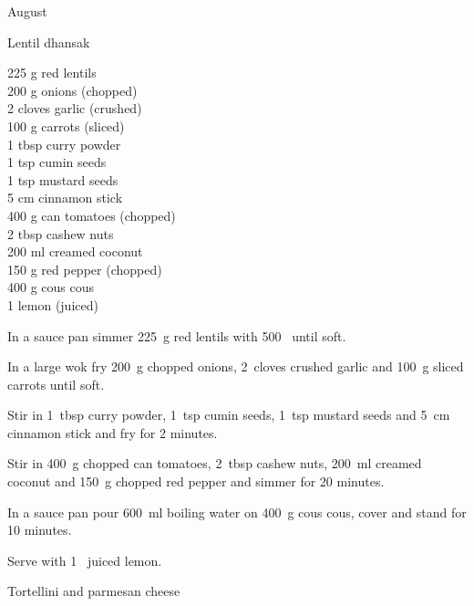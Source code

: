 \begin{menu}{August}
\begin{recipe}{2}{Lentil dhansak}
		\begin{ingredients}
		225 g red lentils  \\
	200 g onions (chopped) \\
	2 cloves garlic (crushed) \\
	100 g carrots (sliced) \\
	1 tbsp curry powder  \\
	1 tsp cumin seeds  \\
	1 tsp mustard seeds  \\
	5 cm cinnamon stick  \\
	400 g can tomatoes (chopped) \\
	2 tbsp cashew nuts  \\
	200 ml creamed coconut  \\
	150 g red pepper (chopped) \\
	400 g cous cous  \\
	1  lemon (juiced) \\
	
		\end{ingredients}
	
	
    \begin{instructions}
    \item 
        In a sauce pan simmer
        225~g  red lentils  
        with 500~  
        until soft.      
      \item 
        In a large wok fry
        200~g chopped onions,
        2~cloves crushed garlic
        and
        100~g sliced carrots
        until soft.
      \item 
        Stir in
        1~tbsp  curry powder,
        1~tsp  cumin seeds,
        1~tsp  mustard seeds
        and
        5~cm  cinnamon stick
        and fry for 2 minutes.
      \item 
        Stir in
        400~g chopped can tomatoes,
        2~tbsp  cashew nuts,
        200~ml  creamed coconut
        and
        150~g chopped red pepper
        and simmer for 20 minutes.
      \item 
      In a
      sauce pan pour 600~ml  boiling water
      on 400~g  cous cous, cover and
      stand for 10 minutes.
    \item 
        Serve with
        1~ juiced lemon.
      
    \end{instructions}
    \end{recipe}%
  
    \begin{recipe}{1}{Tortellini and parmesan cheese}%
    

\end{recipe}
\end{menu}
